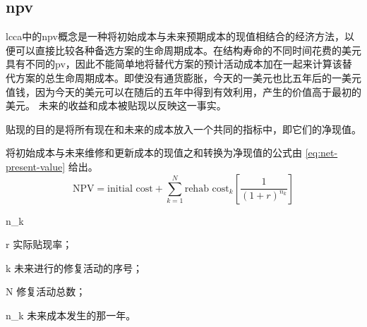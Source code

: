 \subsection{\texorpdfstring{\acrlong*{npv}}{净现值（NPV）}}
\label{subsec:npv}
\acrlong*{lcca}中的\acrlong*{npv}概念是一种将初始成本与未来预期成本的现值相结合的经济方法，以便可以直接比较各种备选方案的生命周期成本。在结构寿命的不同时间花费的美元具有不同的\acrlong*{pv}，因此不能简单地将替代方案的预计活动成本加在一起来计算该替代方案的总生命周期成本。即使没有通货膨胀，今天的一美元也比五年后的一美元值钱，因为今天的美元可以在随后的五年中得到有效利用，产生的价值高于最初的美元。 未来的收益和成本被贴现以反映这一事实。

贴现的目的是将所有现在和未来的成本放入一个共同的指标中，即它们的净现值。

将初始成本与未来维修和更新成本的现值之和转换为净现值的公式由 \cref{eq:net-present-value} 给出。
\begin{equation}
  \label{eq:net-present-value}
  \mathrm{NPV} =\text{initial cost} + \sum\limits_{k=1}^N \text{rehab cost}_k \left[ \frac{1}{(1+r)^{n_k}}\right]
\end{equation}
\begin{EqDesc}{n_k}
  \item [r] 实际贴现率；
  \item [k] 未来进行的修复活动的序号；
  \item [N] 修复活动总数；
  \item [n_k] 未来成本发生的那一年。
\end{EqDesc}

